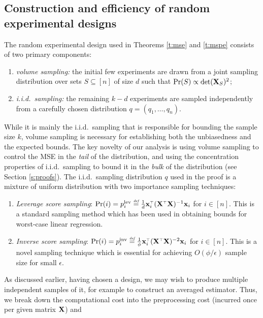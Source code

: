 \documentclass[12pt]{sty/colt2019/colt2018-arxiv}
\begin{document}
\subsection{Construction and efficiency of random experimental designs}\label{ss:RED}
The random experimental design used in Theorems
\ref{t:mse} and \ref{t:mspe} consists of two primary components:
	\vspace{-1mm}
\begin{enumerate}
  \item \textit{volume sampling:} the initial few experiments are drawn
    from a joint sampling distribution over 
    sets $S\subseteq [n]$ of size $d$ such that $\mathrm{Pr}(S)\propto
    \det(\mathbf X_S)^2$;
	\vspace{-1mm}
  \item \textit{i.i.d.~sampling:} the remaining $k-d$ experiments are
    sampled independently from a carefully chosen distribution
    $q=(q_1,\dots,q_n)$. 
  \end{enumerate}
	\vspace{-1mm}
  While it is mainly the i.i.d.~sampling that is responsible for 
bounding the sample size $k$, volume sampling is
  necessary for establishing both the unbiasedness and the expected
  bounds. The key novelty of our analysis is using volume sampling to
  control the MSE in the \textit{tail} of the
  distribution, and using the concentration properties of
  i.i.d.~sampling to bound it in the \textit{bulk} of the
  distribution (see Section \ref{s:proofs}). The i.i.d.~sampling
  distribution $q$ used in the proof is a mixture of uniform
  distribution with two importance sampling techniques:
  \begin{enumerate}
  \item  \textit{Leverage score sampling}: $\Pr(i)=p_i^{\mathrm{lev}}
\defeq \frac1d \x_i^\top(\X^\top\X)^{-1}\x_i$ for
  $i\in[n]$. This is a standard sampling method which has been used in
  obtaining bounds for worst-case linear regression.
  \item \textit{Inverse score sampling}: $\Pr(i)= p_i^{\mathrm{inv}}\defeq
    \frac1\phi\x_i^\top(\X^\top\X)^{-2}\x_i$ for
    $i\in[n]$. This is a novel sampling technique which is essential
    for achieving $O(\phi/\epsilon)$ sample size for small $\epsilon$.
  \end{enumerate}
As discussed earlier, having chosen a design, we may wish to
produce multiple independent samples of it, for example to construct
an averaged estimator. Thus, we break down the computational cost into
the preprocessing cost (incurred once per given matrix $\mathbf X$) and
\end{document}
